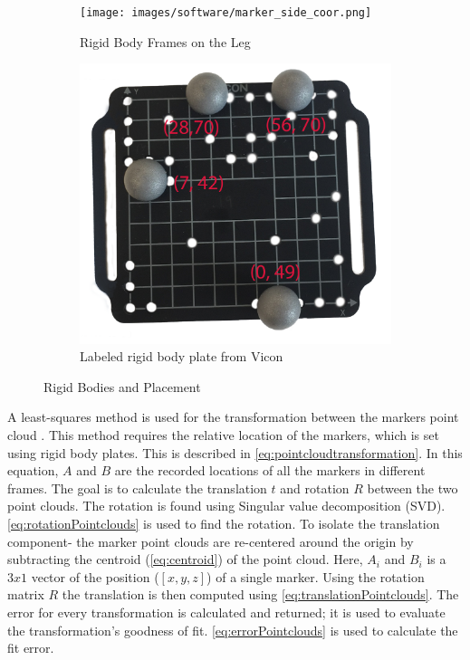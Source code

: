 \begin{figure}
\centering 
\begin{subfigure}{0.4\linewidth} 
  \centering 
  \texttt{[image: images/software/marker\_side\_coor.png]} 
  \caption[RigidBody Frames]{Rigid Body Frames on the Leg} 
  \label{fig:markers_side} 
\end{subfigure} 
%
\begin{subfigure}{0.4\linewidth} 
  \centering 
    \centering
    \includegraphics[scale=0.11]{images/software/rigidbody_label.png} 
    \caption{Labeled rigid body plate from Vicon}
    \label{fig:rigidbody}
\end{subfigure} 
\caption[Rigidbodies and Placement]{Rigid Bodies and Placement} 
\label{fig:markers} 

\end{figure} 

A least-squares method is used for the transformation between the markers point cloud \cite{arun1987least}. This method requires the relative location of the markers, which is set using rigid body plates. This is described in \autoref{eq:pointcloudtransformation}. In this equation, $A$ and $B$ are the recorded locations of all the markers in different frames. The goal is to calculate the translation $t$ and rotation $R$ between the two point clouds. The rotation is found using Singular value decomposition (SVD). \autoref{eq:rotationPointclouds} is used to find the rotation. To isolate the translation component- the marker point clouds are re-centered around the origin by subtracting the centroid (\autoref{eq:centroid}) of the point cloud. Here, $A_i$ and $B_i$ is a $3x1$ vector of the position ($[x,y,z]$) of a single marker. Using the rotation matrix $R$ the translation is then computed using  \autoref{eq:translationPointclouds}.  The error for every transformation is calculated and returned; it is used to evaluate the transformation's goodness of fit. \autoref{eq:errorPointclouds} is used to calculate the fit error.   


